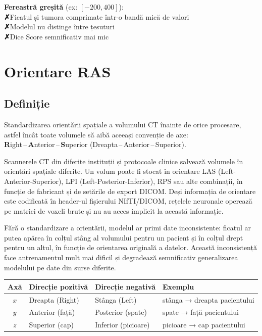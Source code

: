 \documentclass[12pt, a4paper]{report}
\newcommand{\con}{\textcolor{accentred}{\textbf{✗}}\;}
\begin{document}
\begin{badbox}
\textbf{Fereastră greșită} (ex: $[-200, 400]$):\\
\con Ficatul și tumora comprimate într-o bandă mică de valori \\
\con Modelul nu distinge între țesuturi \\
\con Dice Score semnificativ mai mic
\end{badbox}

\section{Orientare RAS}
\label{sec:ras}

\subsection{Definiție}

\vspace{4pt}
\begin{infobox}
Standardizarea orientării spațiale a volumului CT înainte de orice procesare,
astfel încât toate volumele să aibă aceeași convenție de axe:\\[4pt]
\hspace*{1em}\textbf{R}ight\,--\,\textbf{A}nterior\,--\,\textbf{S}uperior
\quad (Dreapta\,--\,Anterior\,--\,Superior).
\end{infobox}

Scannerele CT din diferite instituții și protocoale clinice salvează volumele în orientări
spațiale diferite. Un volum poate fi stocat în orientare LAS (Left-Anterior-Superior),
LPI (Left-Posterior-Inferior), RPS sau alte combinații, în funcție de fabricant și de setările
de export DICOM. Deși informația de orientare este codificată în header-ul fișierului NIfTI/DICOM,
rețelele neuronale operează pe matrici de voxeli brute și nu au acces implicit la această informație.

Fără o standardizare a orientării, modelul ar primi date inconsistente: ficatul ar putea apărea
în colțul stâng al volumului pentru un pacient și în colțul drept pentru un altul, în funcție de
orientarea originală a datelor. Această inconsistență face antrenamentul mult mai dificil
și degradează semnificativ generalizarea modelului pe date din surse diferite.

\begin{center}
\begin{tabular}{clll}
    \toprule
    \textbf{Axă} & \textbf{Direcție pozitivă} & \textbf{Direcție negativă} & \textbf{Exemplu} \\
    \midrule
    $x$ & Dreapta (Right)    & Stânga (Left)     & stânga → dreapta pacientului \\
    $y$ & Anterior (față)    & Posterior (spate) & spate → față pacientului \\
    $z$ & Superior (cap)     & Inferior (picioare) & picioare → cap pacientului \\
    \bottomrule
\end{tabular}
\end{center}
\end{document}
